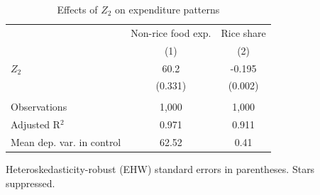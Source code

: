 
\begin{table}[htbp]
   \caption{\label{tab:exp_z2} Effects of $Z_2$ on expenditure patterns}
   \bigskip
   \centering
   \begin{tabular}{lcc}
      \toprule
                                & Non-rice food exp. & Rice share \\   
                                & (1)                & (2)\\  
      \midrule 
      $Z_2$                     & 60.2               & -0.195\\   
                                & (0.331)            & (0.002)\\   
       \\
      Observations              & 1,000              & 1,000\\  
      Adjusted R$^2$            & 0.971              & 0.911\\  
      Mean dep. var. in control & 62.52              & 0.41\\  
      \bottomrule
   \end{tabular}
   
   \par \raggedright 
   Heteroskedasticity-robust (EHW) standard errors in parentheses. Stars suppressed.
\end{table}


